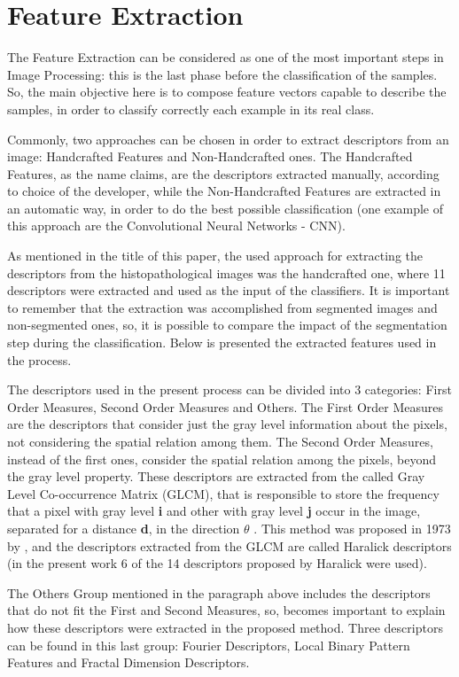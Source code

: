 \documentclass[conference]{IEEEtran}
\begin{document}
\section{Feature Extraction}
The Feature Extraction can be considered as one of the most important steps in Image Processing: this is the last phase before the classification of the samples. So, the main objective here is to compose feature vectors capable to describe the samples, in order to classify correctly each example in its real class.\par
Commonly, two approaches can be chosen in order to extract descriptors from an image: Handcrafted Features and Non-Handcrafted ones. The Handcrafted Features, as the name claims, are the descriptors extracted manually, according to choice of the developer, while the Non-Handcrafted Features are extracted in an automatic way, in order to do the best possible classification (one example of this approach are the Convolutional Neural Networks - CNN). \par
As mentioned in the title of this paper, the used approach for extracting the descriptors from the histopathological images was the handcrafted one, where 11 descriptors were extracted and used as the input of the classifiers. It is important to remember that the extraction was accomplished from segmented images and non-segmented ones, so, it is possible to compare the impact of the segmentation step during the classification. Below is presented the extracted features used in the process.\par
The descriptors used in the present process can be divided into 3 categories: First Order Measures, Second Order Measures and Others. The First Order Measures are the descriptors that consider just the gray level information about the pixels, not considering the spatial relation among them. The Second Order Measures, instead of the first ones, consider the spatial relation among the pixels, beyond the gray level property. These descriptors are extracted from the called Gray Level Co-occurrence Matrix (GLCM), that is responsible to store the frequency that a pixel with gray level \textbf{i} and other with gray level \textbf{j} occur in the image, separated for a distance \textbf{d}, in the direction\textbf{ $\theta$} \cite{conci2008computacao}. This method was proposed in 1973 by \cite{haralick:smc1973}, and the descriptors extracted from the GLCM are called Haralick descriptors (in the present work 6 of the 14 descriptors proposed by Haralick were used).\par
The Others Group mentioned in the paragraph above includes the descriptors that do not fit the First and Second Measures, so, becomes important to explain how these descriptors were extracted in the proposed method. Three descriptors can be found in this last group: Fourier Descriptors, Local Binary Pattern Features and Fractal Dimension Descriptors. \par
\end{document}
